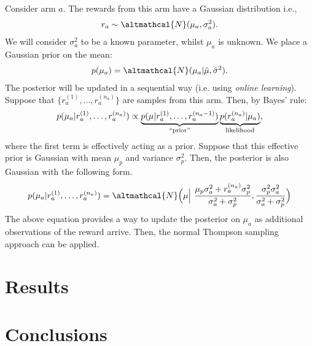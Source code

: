 \documentclass[a4paper]{article}
\begin{document}
	Consider arm $a$. The rewards from this arm have a Gaussian distribution i.e., 
	\begin{align}
	r_a \sim \altmathcal{N}(\mu_a, \sigma_a^2).
	\end{align} 
	We will consider $\sigma_a^2$ to be a known parameter, whilst $\mu_a$ is unknown. We place a Gaussian prior on the mean:
	\begin{align}
	p(\mu_a) = \altmathcal{N}(\mu_a | \hat{\mu}, \hat{\sigma}^2).
	\end{align}
	The posterior will be updated in a sequential way (i.e. using \emph{online learning}). Suppose that $\lbrace r_a^{(1)}, \ldots, r_a^{(n_a)} \rbrace$ are samples from this arm. Then, by Bayes' rule:
	\begin{align}
	p(\mu_a | r_a^{(1)}, \ldots, r_a^{(n_a)}) \propto \underbrace{p(\mu | r_a^{(1)}, \ldots, r_a^{(n_a - 1)})}_{``\text{prior}"}  \underbrace{p( r_a^{(n_a)} | \mu_a)}_{\text{likelihood}},
	\end{align}
	where the first term is effectively acting as a prior. Suppose that this effective prior is Gaussian with mean $\mu_p$ and variance $\sigma_p^2$. Then, the posterior is also Gaussian with the following form. 
	\begin{align}
	p(\mu_a | r_a^{(1)}, \ldots, r_a^{(n_a)}) = \altmathcal{N} \Big( \mu \Big|\ \frac{\mu_p \sigma_a^2 + r_a^{(n_a)} \sigma_p^2 }{\sigma_a^2 + \sigma_p^2}, \frac{\sigma_p^2 \sigma_a^2}{\sigma_a^2 + \sigma_p^2} \Big)
	\end{align}
	The above equation provides a way to update the posterior on $\mu_a$ as additional observations of the reward arrive. Then, the normal Thompson sampling approach can be applied. 
	
	\section{Results}
	
	\section{Conclusions}


\end{document}
